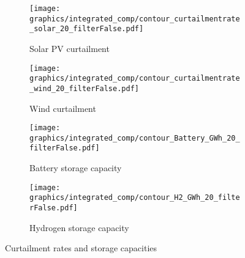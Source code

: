 \begin{figure*}[h] %
    \centering
    \begin{subfigure}[b]{0.45\linewidth}
        \centering
        \texttt{[image: graphics/integrated\_comp/contour\_curtailmentrate\_solar\_20\_filterFalse.pdf]}
        \caption{Solar PV curtailment}
        \label{fig:solar_curt}
    \end{subfigure}
    \hfill
    \begin{subfigure}[b]{0.45\linewidth}
        \centering
        \texttt{[image: graphics/integrated\_comp/contour\_curtailmentrate\_wind\_20\_filterFalse.pdf]}
        \caption{Wind curtailment}
        \label{fig:wind_curt}
    \end{subfigure}
    \hfill
    \begin{subfigure}[b]{0.45\linewidth}
        \centering
        \texttt{[image: graphics/integrated\_comp/contour\_Battery\_GWh\_20\_filterFalse.pdf]}
        \caption{Battery storage capacity}
        \label{fig:battery_cap}
    \end{subfigure}
    \hfill
    \begin{subfigure}[b]{0.45\linewidth}
        \centering
        \texttt{[image: graphics/integrated\_comp/contour\_H2\_GWh\_20\_filterFalse.pdf]}
        \caption{Hydrogen storage capacity}
        \label{fig:hystorage_cap}
    \end{subfigure}
    \hfill

    \caption{Curtailment rates and storage capacities}
    \label{fig:integration_options}
\end{figure*}

\clearpage